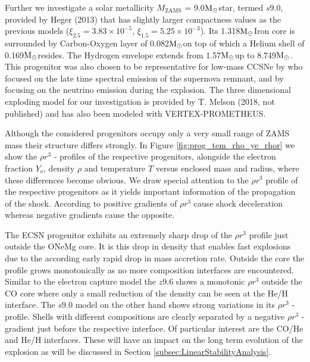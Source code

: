 \documentclass[fleqn,usenatbib]{mnras}
\newcommand{\solm}{\xspace\ensuremath{\rm{M_{\odot}}}}
\newcommand{\vertexprom}{\textsc{V{\footnotesize ERTEX}-P{\footnotesize ROMETHEUS}}\xspace}
\begin{document}
Further we investigate a solar metallicity $M_{\mathrm{ZAMS}}$ = 9.0\solm star, termed $s9.0$, provided by Heger (2013) that has slightly larger compactness values as the previous models ($\xi_{2.5}= 3.83 \times 10^{-5}$, $\xi_{1.5}= 5.25 \times 10^{-3}$). Its 1.318\solm Iron core is surrounded by Carbon-Oxygen layer of 0.082\solm on top of which a Helium shell of 0.169\solm resides. The Hydrogen envelope extends from 1.57\solm up to 8.749\solm. 
This progenitor was also chosen to be representative for low-mass CCSNe by \cite{Jerkstrand2017a} who focused on the late time spectral emission of the supernova remnant, and by \cite{Glas2018} focusing on the neutrino emission during the explosion. The three dimensional exploding model for our investigation is provided by T. Melson (2018, not published) and has also been modeled with \vertexprom.

Although the considered progenitors occupy only a very small range of ZAMS mass their structure differs strongly. In Figure \ref{fig:prog_tem_rho_ye_rhor} we show the $\rho r^3$ - profiles of the respective progenitors, alongside the electron fraction $Y_{\mathrm{e}}$, density $\rho$ and temperature $T$ versus enclosed mass and radius, where these differences become obvious. We draw special attention to the $\rho r^3$ profile of the respective progenitors as it yields important information of the propagation of the shock. According to \cite{Sedov1959} positive gradients of $\rho r^3$ cause shock deceleration whereas negative gradients cause the opposite. 

The ECSN progenitor exhibits an extremely sharp drop of the $\rho r^3$ profile just outside the ONeMg core. It is this drop in density that enables fast explosions due to the according early rapid drop in mass accretion rate. Outside the core the profile grows monotonically as no more composition interfaces are encountered.  
Similar to the electron capture model the $z9.6$ shows a monotonic $\rho r^3$ outside the CO core where only a small reduction of the density can be seen at the He/H interface.
The $s9.0$ model on the other hand shows strong variations in its $\rho r^3$ - profile. Shells with different compositions are clearly separated by a negative $\rho r^3$ - gradient just before the respective interface. Of particular interest are the CO/He and He/H interfaces. These will have an impact on the long term evolution of the explosion as will be discussed in Section \ref{subsec:LinearStabilityAnalysis}.


\end{document}
